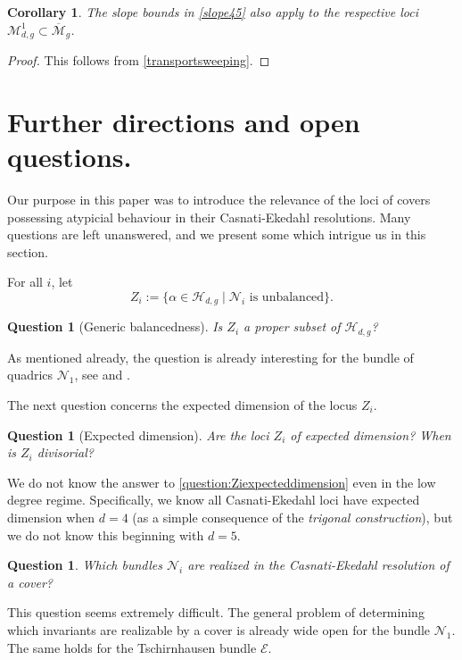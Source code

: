 \documentclass[reqno, 10 pt]{article}
\newtheorem{cor}[thm]{Corollary}
\newtheorem{question}[thm]{Question}
\theoremstyle{definition}
\theoremstyle{remark}
\numberwithin{equation}{section}
\numberwithin{thm}{section}
\numberwithin{prop}{section}
\numberwithin{lem}{section}
\numberwithin{cor}{section}
\numberwithin{conj}{section}
\numberwithin{defn}{section}
\renewcommand{\H}{\mathcal H}
\newcommand{\Mg}{{\overline{\mathcal{M}}_{g}}}
\newcommand{\cE}{{\mathcal E}}
\newcommand{\cM}{{\mathcal M}}
\newcommand{\cN}{{\mathcal N}}
\renewcommand{\H}{{\mathcal{H}}}
\begin{document}
\begin{cor}
The slope bounds in \autoref{slope45} also apply to the respective loci $\cM^{1}_{d,g} \subset \Mg$.
\end{cor}

\begin{proof}
This follows from \autoref{transportsweeping}.
\end{proof}

\section{Further directions and open questions.} 

Our purpose in this paper was to introduce the relevance of the loci of covers possessing atypicial behaviour in their Casnati-Ekedahl resolutions. Many questions are left unanswered, and we present some which intrigue us in this section.

For all $i$, let $$Z_{i} := \{\alpha \in \H_{d,g} \mid \text{$\cN_{i}$ is unbalanced}\}.$$
\begin{question}[Generic balancedness] \label{question:Nibalanced}
Is $Z_{i}$ a proper subset of $\H_{d,g}$?
\end{question}

As mentioned already, the question is already interesting for the bundle of quadrics $\cN_{1}$, see \cite{bujokas-patel} and \cite{bopp-hoff}.

The next question concerns the expected dimension of the locus $Z_{i}$. 

\begin{question}[Expected dimension]\label{question:Ziexpecteddimension}
Are the loci $Z_{i}$ of expected dimension? When is $Z_{i}$ divisorial?  
\end{question}

We do not know the answer to \autoref{question:Ziexpecteddimension} even in the low degree regime.  Specifically, we know all Casnati-Ekedahl loci have expected dimension when $d=4$ (as a simple consequence of the {\sl trigonal construction}), but we do not know this beginning with $d=5$.

\begin{question}
Which bundles $\cN_{i}$ are realized in the Casnati-Ekedahl resolution of a cover? 
\end{question}

This question seems extremely difficult. The general problem of determining which invariants are realizable by a cover is already wide open for the bundle $\cN_{1}$.  The same holds for the Tschirnhausen bundle $\cE$.
\end{document}
